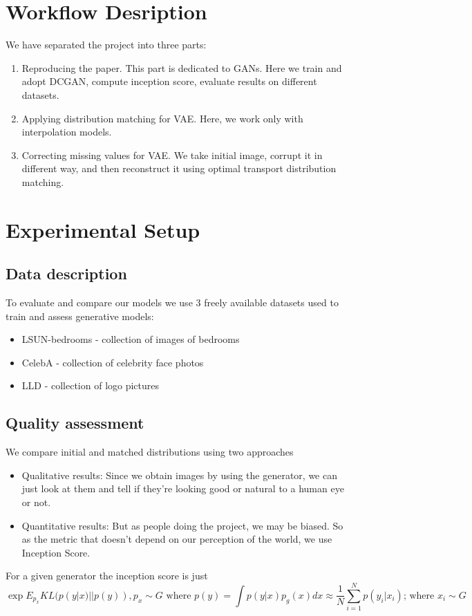 \documentclass{article}
\begin{document}
\section{Workflow Desription}
We have separated the project into three parts:

\begin{enumerate}
    \item Reproducing the paper. This part is dedicated to GANs. 
        Here we train and adopt DCGAN,
        compute inception score, evaluate results on 
        different datasets.

    \item Applying distribution matching for VAE. Here, we work
        only with interpolation models.

    \item Correcting missing values for VAE. We take 
        initial image, corrupt it in different way, 
        and then reconstruct 
        it using optimal transport distribution matching.
\end{enumerate}

\section{Experimental Setup}
\subsection{Data description}
To evaluate and compare our models we use 3 freely available datasets used to train and assess generative models:
\begin{itemize}
    \item LSUN-bedrooms - collection of images of bedrooms
    \item CelebA - collection of celebrity face photos
    \item LLD - collection of logo pictures
\end{itemize}

\subsection{Quality assessment}
We compare initial and matched distributions using two approaches
\begin{itemize}
    \item Qualitative results: Since we obtain images by using the generator, we can just look at them and tell if they're looking good or natural to a human eye or not.
    \item Quantitative results: But as people doing the project, we may be biased. So as the metric that doesn't depend on our perception of the world, we use Inception Score. 
\end{itemize}
For a given generator the inception score is just
    $$
    \exp{E_{p_x}KL(p(y|x) || p(y))}, p_x \sim G \text{ where } p(y) = \int p(y|x)p_g(x) dx \approx \frac{1}{N}\sum_{i=1}^{N} p(y_i|x_i) \text{; where } x_i \sim G
    $$
    
\end{document}
